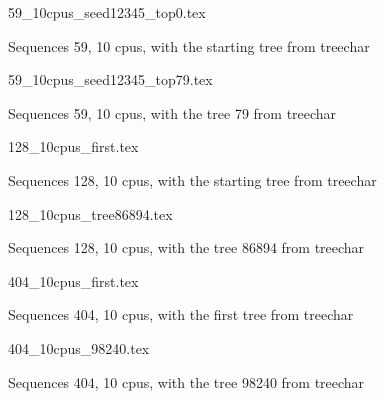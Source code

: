 \documentclass[12pt,a4paper]{article}
\begin{document}
\begin{figure}
\caption*{Sequences 59, 10 cpus, with the starting tree from treechar}
{59_10cpus_seed12345_top0.tex}
\end{figure}
 
\begin{figure}
\caption*{Sequences 59, 10 cpus, with the tree 79 from treechar}
{59_10cpus_seed12345_top79.tex}
\end{figure}


\begin{figure}
\caption*{Sequences 128, 10 cpus, with the starting tree from treechar}
{128_10cpus_first.tex}
\end{figure}

\begin{figure}
\caption*{Sequences 128, 10 cpus, with the tree 86894 from treechar}
{128_10cpus_tree86894.tex}
\end{figure}

 
\begin{figure}
\caption*{Sequences 404, 10 cpus, with the first tree from treechar}
{404_10cpus_first.tex}
\end{figure}

 
\begin{figure}
\caption*{Sequences 404, 10 cpus, with the tree 98240 from treechar}
{404_10cpus_98240.tex}
\end{figure}
\end{document}
